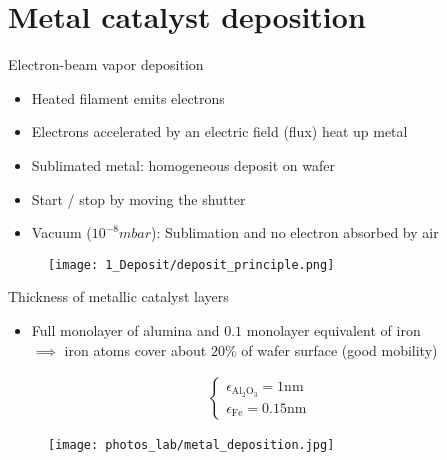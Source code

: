 \documentclass{beamer}
\begin{document}
\section{Metal catalyst deposition}

\begin{frame}{Electron-beam vapor deposition}
\begin{itemize}
    \item Heated filament emits electrons
    \item Electrons accelerated by an electric field (flux) heat up metal
    \item Sublimated metal: homogeneous deposit on wafer
    \item Start / stop by moving the shutter
    \item Vacuum ($10^{-8} mbar$): Sublimation and no electron absorbed by air
\end{itemize}
\begin{figure}[h]
    \centering
    \label{fig:Evap}\texttt{[image: 1\_Deposit/deposit\_principle.png]}
\end{figure}
\end{frame}

\begin{frame}{Thickness of metallic catalyst layers}
\begin{itemize}
    \item Full monolayer of alumina and $0.1$ monolayer equivalent of iron \\ $\implies$ iron atoms cover about $20\%$ of wafer surface (good mobility)
\end{itemize}
\begin{align}
    \begin{cases}
        \epsilon_{\mathrm{Al_2O_3}} =  1 \mathrm{nm}\\
        \epsilon_{\mathrm{Fe}} = 0.15 \mathrm{nm}
    \end{cases}
\end{align}
\begin{figure}
    \centering
    \texttt{[image: photos\_lab/metal\_deposition.jpg]}
    \label{fig:waf}
\end{figure}
\end{frame}
\end{document}
